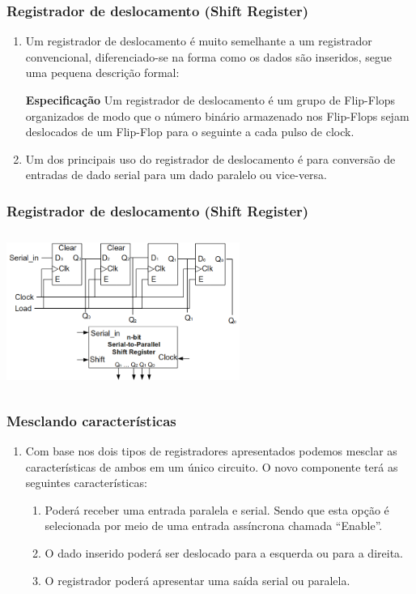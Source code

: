 \documentclass{beamer}
\begin{document}
\begin{frame}
  \frametitle{Registrador de deslocamento (Shift Register)}
  \begin{enumerate}
   \item Um registrador de deslocamento é muito semelhante a um registrador convencional, diferenciado-se na forma como os dados são inseridos, segue uma 
	 pequena descrição formal:\pause
    \begin{block}{\textbf{Especificação}}
      Um registrador de deslocamento é um grupo de Flip-Flops organizados de modo que o número binário armazenado nos Flip-Flops sejam deslocados de 
	     um Flip-Flop para o seguinte a cada pulso de clock. 
    \end{block} \pause
  
    \item Um dos principais uso do registrador de deslocamento é para conversão de entradas de dado serial para um dado paralelo ou vice-versa.
  \end{enumerate}
\end{frame}

\begin{frame}
  \frametitle{Registrador de deslocamento (Shift Register)}
  \includegraphics[height=2in, width = 3in]{registrador_de_deslocamento.png}
\end{frame}

\begin{frame}
 \frametitle{Mesclando características}
  \begin{enumerate}
    \item Com base nos dois tipos de registradores apresentados podemos mesclar as características de ambos em um único circuito. O novo componente terá as 
	 seguintes características:\pause
    \begin{enumerate}
      \item Poderá receber uma entrada paralela e serial. Sendo que esta opção é selecionada por meio de uma entrada assíncrona chamada “Enable”.\pause
      \item O dado inserido poderá ser deslocado para a esquerda ou para a direita.\pause
      \item O registrador poderá apresentar uma saída serial ou paralela. 
    \end{enumerate}
  \end{enumerate}
\end{frame}
\end{document}
